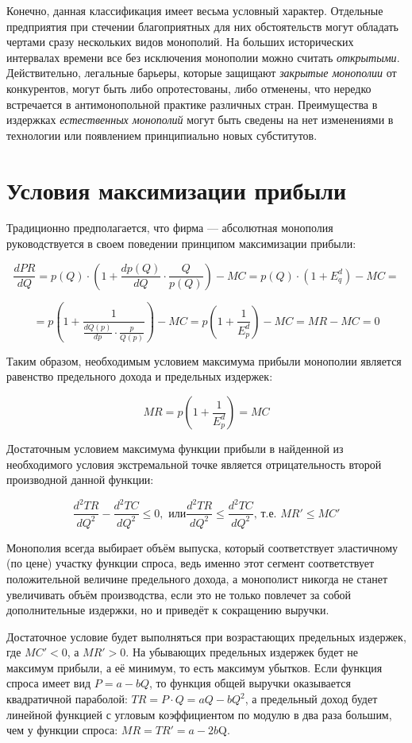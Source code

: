 \documentclass[12pt]{article}
\begin{document}
    Конечно, данная классификация имеет весьма условный характер. Отдельные предприятия при стечении благоприятных для них обстоятельств могут обладать чертами сразу нескольких видов монополий. На больших исторических интервалах времени все без исключения монополии можно считать \emph{открытыми}. Действительно, легальные барьеры, которые защищают \emph{закрытые монополии} от конкурентов, могут быть либо опротестованы, либо отменены, что нередко встречается в антимонопольной практике различных стран. Преимущества в издержках \emph{естественных монополий} могут быть сведены на нет изменениями в технологии или появлением принципиально новых субститутов.

    \newpage

    \section*{Условия максимизации прибыли}

    Традиционно предполагается, что фирма --- абсолютная монополия руководствуется в своем поведении принципом максимизации прибыли:

    $$ \frac{dPR}{dQ} = p(Q) \cdot (1 + \frac{dp(Q)}{dQ} \cdot \frac{Q}{p(Q)}) - MC = p(Q) \cdot ( 1 + E_q^d) - MC =  $$

    $$ = p ( 1 + \frac{1}{\frac{dQ(p)}{dp} \cdot \frac{p}{Q(p)}}) - MC = p(1 + \frac{1}{E_p^d}) - MC = MR - MC = 0 $$

    Таким  образом,  необходимым  условием  максимума  прибыли монополии является равенство предельного дохода и предельных издержек:

    $$ MR = p(1 + \frac{1}{E_p^d}) = MC $$

    Достаточным условием максимума функции прибыли в найденной из необходимого условия экстремальной точке является отрицательность второй производной данной функции:

    $$ \frac{d^2TR}{dQ^2} - \frac{d^2TC}{dQ^2} \leq 0, \text{ или} \frac{d^2TR}{dQ^2} \leq \frac{d^2TC}{dQ^2} \text{, т.е. } MR' \leq MC'$$

    Монополия всегда выбирает объём выпуска, который соответствует эластичному (по цене) участку функции спроса, ведь именно этот сегмент соответствует положительной величине предельного дохода, а монополист никогда не станет увеличивать объём производства, если это не только повлечет за собой дополнительные издержки, но и приведёт к сокращению выручки.

    Достаточное условие будет выполняться при возрастающих предельных  издержек,  где $MC' < 0$, а $MR' > 0$. На убывающих предельных издержек будет не максимум прибыли, а её минимум, то есть максимум убытков. Если функция спроса имеет вид $P = a - bQ$, то функция общей выручки  оказывается квадратичной параболой: $TR = P \cdot Q = aQ - bQ^2$, а предельный доход будет линейной функцией с угловым коэффициентом по модулю в два раза большим, чем у функции спроса: $MR = TR' = a - 2b$Q.
\end{document}
